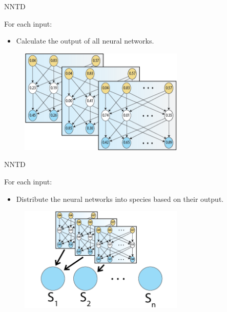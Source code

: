 \begin{frame}{NNTD}
\begin{center}
For each input:
  \begin{itemize}
      \item Calculate the output of all neural networks.
  \end{itemize}
   \begin{figure}[p]
  \includegraphics[width=0.7\textwidth]{images/neuralnetworkvalues.png}
  \end{figure}
\end{center}
\end{frame}

\begin{frame}{NNTD}
\begin{center}
For each input:
  \begin{itemize}
	  \item Distribute the neural networks into species based on their output.
  \end{itemize}
     \begin{figure}[p]
  \includegraphics[width=0.7\textwidth]{images/speciesnn.png}
  \end{figure}
\end{center}
\end{frame}

